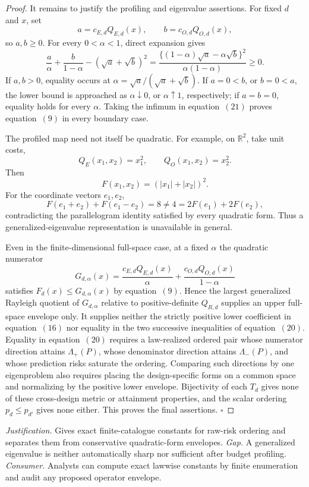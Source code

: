 \documentclass{article}
\begin{document}
\begin{proof}
It remains to justify the profiling and eigenvalue assertions.  For fixed \(d\) and \(x\), set
\[
 a=c_{E,d}Q_{E,d}(x),\qquad b=c_{O,d}Q_{O,d}(x),
\]
so \(a,b\ge0\).  For every \(0<\alpha<1\), direct expansion gives
\[
 \frac a\alpha+\frac b{1-\alpha}-(\sqrt a+\sqrt b)^2
 =\frac{\{(1-\alpha)\sqrt a-\alpha\sqrt b\}^2}
        {\alpha(1-\alpha)}\ge0.                           \tag{21}
\]
If \(a,b>0\), equality occurs at
\(
 \alpha=\sqrt a/(\sqrt a+\sqrt b)
\).
If \(a=0<b\), or \(b=0<a\), the lower bound is approached as \(\alpha\downarrow0\), or \(\alpha\uparrow1\), respectively; if \(a=b=0\), equality holds for every \(\alpha\).  Taking the infimum in equation~\((21)\) proves equation~\((9)\) in every boundary case.

The profiled map need not itself be quadratic.  For example, on \(\mathbb R^2\), take unit costs,
\[
 Q_E(x_1,x_2)=x_1^2,
 \qquad Q_O(x_1,x_2)=x_2^2.
\]
Then
\[
 F(x_1,x_2)=(|x_1|+|x_2|)^2.
\]
For the coordinate vectors \(e_1,e_2\),
\[
 F(e_1+e_2)+F(e_1-e_2)=8
 \ne4=2F(e_1)+2F(e_2),                                   \tag{22}
\]
contradicting the parallelogram identity satisfied by every quadratic form.  Thus a generalized-eigenvalue representation is unavailable in general.

Even in the finite-dimensional full-space case, at a fixed \(\alpha\) the quadratic numerator
\[
 G_{d,\alpha}(x)=
 \frac{c_{E,d}Q_{E,d}(x)}\alpha+
 \frac{c_{O,d}Q_{O,d}(x)}{1-\alpha}
\]
satisfies \(F_d(x)\le G_{d,\alpha}(x)\) by equation~\((9)\).  Hence the largest generalized Rayleigh quotient of \(G_{d,\alpha}\) relative to positive-definite \(Q_{R,d}\) supplies an upper full-space envelope only.  It supplies neither the strictly positive lower coefficient in equation~\((16)\) nor equality in the two successive inequalities of equation~\((20)\).  Equality in equation~\((20)\) requires a law-realized ordered pair whose numerator direction attains \(\Lambda_+(P)\), whose denominator direction attains \(\Lambda_-(P)\), and whose prediction risks saturate the ordering.  Comparing such directions by one eigenproblem also requires placing the design-specific forms on a common space and normalizing by the positive lower envelope.  Bijectivity of each \(T_d\) gives none of these cross-design metric or attainment properties, and the scalar ordering \(p_d\le p_{d'}\) gives none either.  This proves the final assertions. \(\square\)
\end{proof}
\par\smallskip\noindent \textit{Justification.} Gives exact finite-catalogue constants for raw-risk ordering and separates them from conservative quadratic-form envelopes. \textit{Gap.} A generalized eigenvalue is neither automatically sharp nor sufficient after budget profiling. \textit{Consumer.} Analysts can compute exact lawwise constants by finite enumeration and audit any proposed operator envelope.
\end{document}
